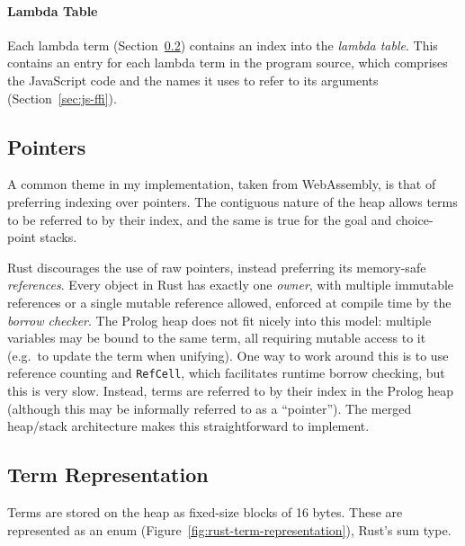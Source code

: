 \vspace*{-2em}

\paragraph{Lambda Table} Each lambda term (Section~\ref{sec:term-representation}) contains an index into the \emph{lambda table}. This contains an entry for each lambda term in the program source, which comprises the JavaScript code and the names it uses to refer to its arguments (Section~\ref{sec:js-ffi}).

\subsection{Pointers}

\label{sec:pointers}

A common theme in my implementation, taken from WebAssembly, is that of preferring indexing over pointers. The contiguous nature of the heap allows terms to be referred to by their index, and the same is true for the goal and choice-point stacks.

Rust discourages the use of raw pointers, instead preferring its memory-safe \emph{references}. Every object in Rust has exactly one \emph{owner}, with multiple immutable references or a single mutable reference allowed, enforced at compile time by the \emph{borrow checker}. The Prolog heap does not fit nicely into this model: multiple variables may be bound to the same term, all requiring mutable access to it (e.g.\ to update the term when unifying). One way to work around this is to use reference counting and \texttt{RefCell}, which facilitates runtime borrow checking, but this is very slow. Instead, terms are referred to by their index in the Prolog heap (although this may be informally referred to as a ``pointer''). The merged heap/stack architecture makes this straightforward to implement.

\subsection{Term Representation}

\label{sec:term-representation}

Terms are stored on the heap as fixed-size blocks of 16 bytes. These are represented as an enum (Figure~\ref{fig:rust-term-representation}), Rust's sum type.

